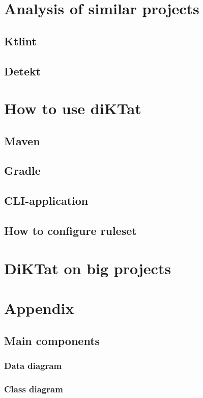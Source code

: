 \documentclass[12pt]{article}
\begin{document}
\newpage

\section{Analysis of similar projects}
\subsection{Ktlint}
\subsection{Detekt}
\newpage

\section{How to use diKTat}
\subsection{Maven}
\subsection{Gradle}
\subsection{CLI-application}
\subsection{How to configure ruleset}
\newpage

\section{DiKTat on big projects}

\newpage
\section{Appendix}
\subsection{Main components}
\subsubsection{Data diagram}
\subsubsection{Class diagram}
\end{document}
